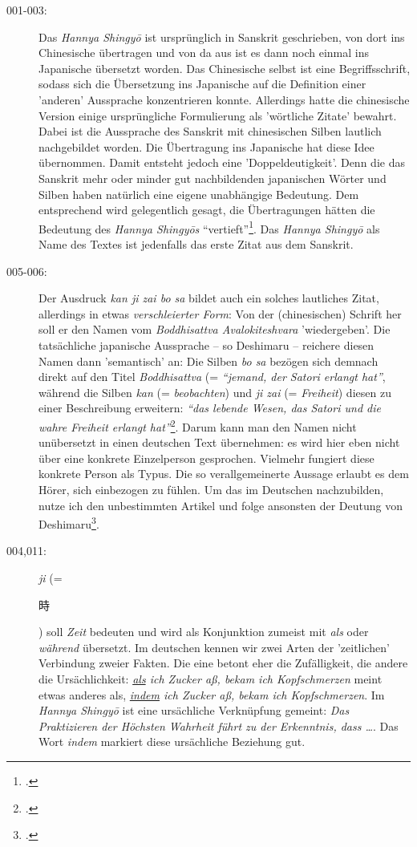 \documentclass[
DIV=calc,
BCOR=5mm,
11pt,
headings=small,
oneside,
bibtotocnumbered]{scrartcl}
\newcommand{\cnbsmi}[1]{\begin{CJK}{UTF8}{bsmi}#1\end{CJK}}
\begin{document}
\begin{description}

  \item[001-003:] Das \emph{Hannya Shingyō} ist ursprünglich in Sanskrit
  geschrieben, von dort ins Chinesische übertragen und von da aus ist es dann
  noch einmal ins Japanische übersetzt worden. Das Chinesische selbst ist eine
  Begriffsschrift, sodass sich die Übersetzung ins Japanische auf die Definition
  einer 'anderen' Aussprache konzentrieren konnte. Allerdings hatte die
  chinesische Version einige ursprüngliche Formulierung als 'wörtliche Zitate'
  bewahrt. Dabei ist die Aussprache des Sanskrit mit chinesischen Silben
  lautlich nachgebildet worden. Die Übertragung ins Japanische hat diese Idee
  übernommen. Damit entsteht jedoch eine 'Doppeldeutigkeit'. Denn die das
  Sanskrit mehr oder minder gut nachbildenden japanischen Wörter und Silben
  haben natürlich eine eigene unabhängige Bedeutung. Dem entsprechend wird
  gelegentlich gesagt, die Übertragungen hätten die Bedeutung des \emph{Hannya
  Shingyōs} \enquote{vertieft}\footcite[vgl.][56]{Deshimaru1988a}. Das
  \emph{Hannya Shingyō} als Name des Textes ist jedenfalls das erste Zitat aus
  dem Sanskrit.

  \item[005-006:] Der Ausdruck \emph{kan ji zai bo sa} bildet auch ein solches
  lautliches Zitat, allerdings in etwas \emph{verschleierter Form}: Von der
  (chinesischen) Schrift her soll er den Namen vom \emph{Boddhisattva
  Avalokiteshvara} 'wiedergeben'. Die tatsächliche japanische Aussprache -- so
  Deshimaru -- reichere diesen Namen dann 'semantisch' an: Die Silben \emph{bo
  sa} bezögen sich demnach direkt auf den Titel \emph{Boddhisattva} (=
  \emph{\enquote{jemand, der Satori erlangt hat}}, während die Silben \emph{kan}
  (= \emph{beobachten}) und \emph{ji zai} (= \emph{Freiheit}) diesen zu einer
  Beschreibung erweitern: \emph{\enquote{das lebende Wesen, das Satori und die
  wahre Freiheit erlangt hat}}\footcite[vgl.][57]{Deshimaru1988a}. Darum kann
  man den Namen nicht unübersetzt in einen deutschen Text übernehmen: es wird
  hier eben nicht über eine konkrete Einzelperson gesprochen. Vielmehr fungiert
  diese konkrete Person als Typus. Die so verallgemeinerte Aussage erlaubt es
  dem Hörer, sich einbezogen zu fühlen. Um das im Deutschen nachzubilden, nutze
  ich den unbestimmten Artikel und folge ansonsten der Deutung von
  Deshimaru\footcite[vgl.][57 et passim]{Deshimaru1988a}.

  \item[004,011:] \emph{ji} (= \cnbsmi{時}) soll \emph{Zeit} bedeuten und wird
  als Konjunktion zumeist mit \emph{als} oder \emph{während} übersetzt. Im
  deutschen kennen wir zwei Arten der 'zeitlichen' Verbindung zweier Fakten. Die
  eine betont eher die Zufälligkeit, die andere die Ursächlichkeit:
  \emph{\underline{als} ich Zucker aß, bekam ich Kopfschmerzen} meint etwas
  anderes als, \emph{\underline{indem} ich Zucker aß, bekam ich Kopfschmerzen}.
  Im \emph{Hannya Shingyō} ist eine ursächliche Verknüpfung gemeint: \emph{Das
  Praktizieren der Höchsten Wahrheit führt zu der Erkenntnis, dass \ldots}. Das
  Wort \emph{indem} markiert diese ursächliche Beziehung gut.


\end{description}
\end{document}
